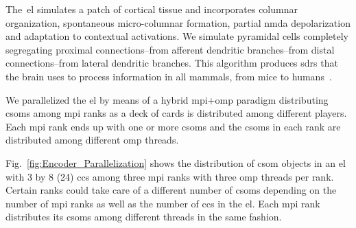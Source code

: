 \documentclass[10pt,journal,compsoc]{IEEEtran}
\begin{document}
The~\gls{el} simulates a patch of cortical tissue and incorporates columnar organization, spontaneous micro-columnar formation, partial \gls{nmda} depolarization and adaptation to contextual activations. We simulate pyramidal cells completely segregating proximal connections--from afferent dendritic branches--from distal connections--from lateral dendritic branches. This algorithm produces \glspl{sdr} that the brain uses to process information in all mammals, from mice to humans~\cite{barth_2012}.

We parallelized the \gls{el} by means of a hybrid \gls{mpi}+\gls{omp} paradigm distributing \glspl{csom} among \gls{mpi} ranks as a deck of cards is distributed among different players. Each \gls{mpi} rank ends up with one or more \glspl{csom} and the \glspl{csom} in each rank are distributed among different \gls{omp} threads.%

Fig.~\ref{fig:Encoder_Parallelization} shows the distribution of \gls{csom} objects in an \gls{el} with 3 by 8 (24) \glspl{cc} among three \gls{mpi} ranks with three \gls{omp} threads per rank. Certain ranks could take care of a different number of \glspl{csom} depending on the number of \gls{mpi} ranks as well as the number of \glspl{cc} in the \gls{el}. Each \gls{mpi} rank distributes its \glspl{csom} among different threads in the same fashion.

\end{document}
